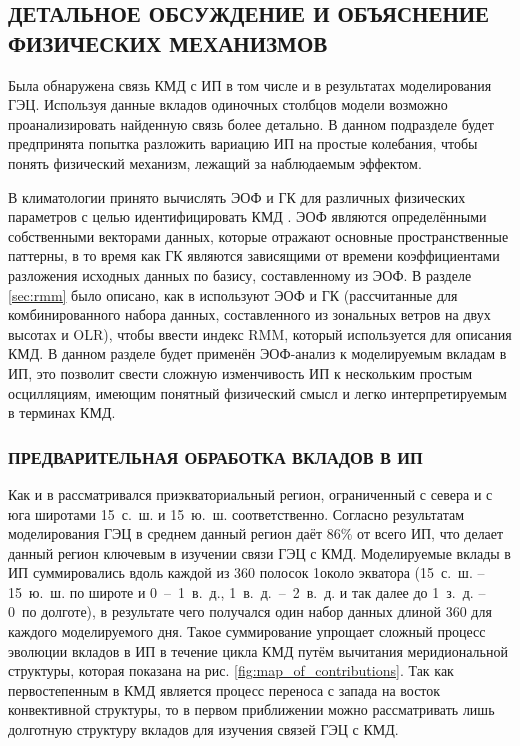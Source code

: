 \subsection{ДЕТАЛЬНОЕ ОБСУЖДЕНИЕ И ОБЪЯСНЕНИЕ ФИЗИЧЕСКИХ МЕХАНИЗМОВ}\label{subsec:2-6}

Была обнаружена связь КМД с ИП в том числе и в результатах моделирования ГЭЦ. Используя данные вкладов одиночных столбцов модели возможно проанализировать найденную связь более детально. В данном подразделе будет предпринята попытка разложить вариацию ИП на простые колебания, чтобы понять физический механизм, лежащий за наблюдаемым эффектом.

В климатологии принято вычислять ЭОФ и ГК для различных физических параметров с целью идентифицировать КМД \cite{Knutson_Weickmann_1987, Slingo_et_al_1999, Lo_Hendon_2000, Matthews_2000, Kessler_2001}. ЭОФ являются определёнными собственными векторами данных, которые отражают основные пространственные паттерны, в то время как ГК являются зависящими от времени коэффициентами разложения исходных данных по базису, составленному из ЭОФ. В разделе \ref{sec:rmm} было описано, как в \cite{Wheeler_Hendon_2004} используют ЭОФ и ГК (рассчитанные для комбинированного набора данных, составленного из зональных ветров на двух высотах и OLR), чтобы ввести индекс RMM, который используется для описания КМД. В данном разделе будет применён ЭОФ-анализ к моделируемым вкладам в ИП, это позволит свести сложную изменчивость ИП к нескольким простым осцилляциям, имеющим понятный физический смысл и легко интерпретируемым в терминах КМД.

\subsubsection{ПРЕДВАРИТЕЛЬНАЯ ОБРАБОТКА ВКЛАДОВ В ИП}
\label{sec:preliminary_processing}

Как и в \cite{Wheeler_Hendon_2004} рассматривался приэкваториальный регион, ограниченный с севера и с юга широтами 15\textdegree~с.~ш. и 15\textdegree~ю.~ш. соответственно. Согласно результатам моделирования ГЭЦ в среднем данный регион даёт 86\% от всего ИП, что делает данный регион ключевым в изучении связи ГЭЦ с КМД. Моделируемые вклады в ИП суммировались вдоль каждой из 360 полосок 1\textdegree{}\textdegree около экватора (15\textdegree~с.~ш. -- 15\textdegree~ю.~ш. по широте и 0\textdegree~--~1\textdegree~в.~д., 1\textdegree~в.~д.~--~2\textdegree~в.~д. и так далее до 1\textdegree~з.~д. -- 0\textdegree\ по долготе), в результате чего получался один набор данных длиной 360 для каждого моделируемого дня. Такое суммирование упрощает сложный процесс эволюции вкладов в ИП в течение цикла КМД путём вычитания меридиональной структуры, которая показана на рис. \ref{fig:map_of_contributions}. Так как первостепенным в КМД является процесс переноса с запада на восток конвективной структуры, то в первом приближении можно рассматривать лишь долготную структуру вкладов для изучения связей ГЭЦ с КМД.

